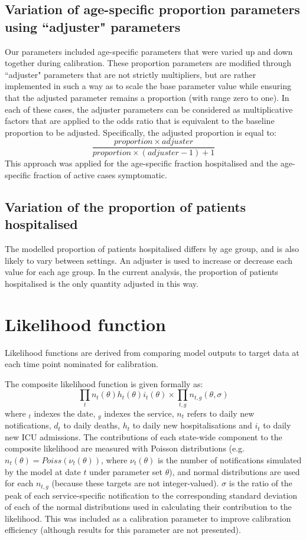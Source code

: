 \subsection{Variation of age-specific proportion parameters using ``adjuster" parameters}
Our parameters included age-specific parameters that were varied up and down together during calibration. These proportion parameters are modified through ``adjuster" parameters that are not strictly multipliers, but are rather implemented in such a way as to scale the base parameter value while ensuring that the adjusted parameter remains a proportion (with range zero to one). In each of these cases, the adjuster parameters can be considered as multiplicative factors that are applied to the odds ratio that is equivalent to the baseline proportion to be adjusted. Specifically, the adjusted proportion is equal to:
\[\frac{proportion \times adjuster}{proportion \times (adjuster-1)+1}\]
This approach was applied for the age-specific fraction hospitalised and the age-specific fraction of active cases symptomatic.

\subsection{Variation of the proportion of patients hospitalised}
The modelled proportion of patients hospitalised differs by age group, and is also likely to vary between settings. An adjuster is used to increase or decrease each value for each age group. In the current analysis, the proportion of patients hospitalised is the only quantity adjusted in this way.

\section{Likelihood function}

Likelihood functions are derived from comparing model outputs to target data at each time point nominated for calibration.

The composite likelihood function is given formally as:
\[\prod_{t}{n_{t}(\theta)h_{t}(\theta)i_{t}(\theta)} \times \prod_{t,g}{n_{t,g}(\theta,\sigma)}\]
where \(_{t}\) indexes the date, \(_{g}\) indexes the service, \(n_{t}\) refers to daily new notifications, \(d_{t}\) to daily deaths, \(h_{t}\) to daily new hospitalisations and \(i_{t}\) to daily new ICU admissions. The contributions of each state-wide component to the composite likelihood are measured with Poisson distributions (e.g. \(n_{t}(\theta)=Poiss(\nu_{t}(\theta))\), where \(\nu_{t}(\theta)\) is the number of notifications simulated by the model at date \(t\) under parameter set \(\theta\)), and normal distributions are used for each \(n_{t,g}\) (because these targets are not integer-valued). \(\sigma\) is the ratio of the peak of each service-specific notification to the corresponding standard deviation of each of the normal distributions used in calculating their contribution to the likelihood. This was included as a calibration parameter to improve calibration efficiency (although results for this parameter are not presented).